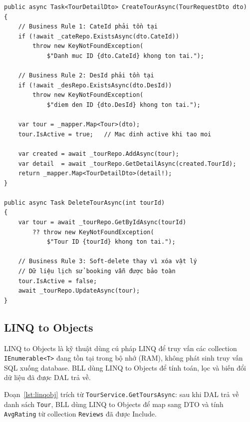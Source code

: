 \begin{lstlisting}[style=csharp,
  caption={Business Rules trong TourService.CreateTourAsync},
  label={lst:bizrule}]
public async Task<TourDetailDto> CreateTourAsync(TourRequestDto dto)
{
    // Business Rule 1: CateId phải tồn tại
    if (!await _cateRepo.ExistsAsync(dto.CateId))
        throw new KeyNotFoundException(
            $"Danh muc ID {dto.CateId} khong ton tai.");

    // Business Rule 2: DesId phải tồn tại
    if (!await _desRepo.ExistsAsync(dto.DesId))
        throw new KeyNotFoundException(
            $"diem den ID {dto.DesId} khong ton tai.");

    var tour = _mapper.Map<Tour>(dto);
    tour.IsActive = true;   // Mac dinh active khi tao moi

    var created = await _tourRepo.AddAsync(tour);
    var detail  = await _tourRepo.GetDetailAsync(created.TourId);
    return _mapper.Map<TourDetailDto>(detail!);
}

public async Task DeleteTourAsync(int tourId)
{
    var tour = await _tourRepo.GetByIdAsync(tourId)
        ?? throw new KeyNotFoundException(
            $"Tour ID {tourId} khong ton tai.");

    // Business Rule 3: Soft-delete thay vì xóa vật lý
    // Dữ liệu lịch sử booking vẫn được bảo toàn
    tour.IsActive = false;
    await _tourRepo.UpdateAsync(tour);
}
\end{lstlisting}

\subsection{LINQ to Objects}\label{sub3.3.3}

\begin{de}\label{def3.6}
LINQ to Objects là kỹ thuật dùng cú pháp LINQ để truy vấn
các collection \texttt{IEnumerable<T>} đang tồn tại trong
bộ nhớ (RAM), không phát sinh truy vấn SQL xuống database.
BLL dùng LINQ to Objects để tính toán, lọc và biến đổi
dữ liệu đã được DAL trả về.
\end{de}

Đoạn~\ref{lst:linqobj} trích từ \texttt{TourService.GetToursAsync}:
sau khi DAL trả về danh sách \texttt{Tour}, BLL dùng
LINQ to Objects để map sang DTO và tính \texttt{AvgRating}
từ collection \texttt{Reviews} đã được Include.

